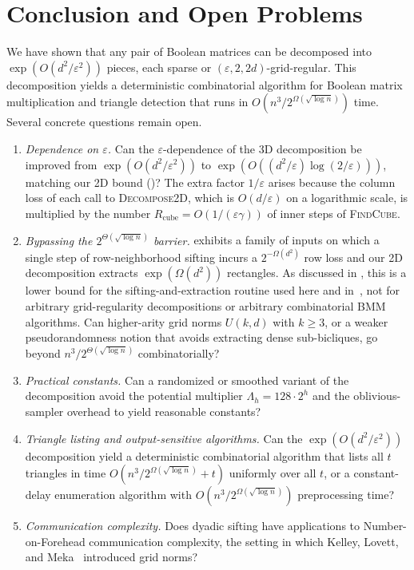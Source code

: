 \documentclass[11pt]{article}
\theoremstyle{definition}
\renewcommand{\label}[1]{}%
\newcommand{\DecomposeTwoD}{\textnormal{\textsc{Decompose2D}}}
\newcommand{\FindCube}{\textnormal{\textsc{FindCube}}}
\begin{document}
\section{Conclusion and Open Problems}
\label{sec:open}

We have shown that any pair of Boolean matrices can be decomposed into $\exp(O(d^2 / \varepsilon^2))$ pieces, each sparse or $(\varepsilon, 2, 2d)$-grid-regular. This decomposition yields a deterministic combinatorial algorithm for Boolean matrix multiplication and triangle detection that runs in $O(n^3 / 2^{\Omega(\sqrt{\log n})})$ time. Several concrete questions remain open.
\begin{enumerate}[leftmargin=*]
    \item \emph{Dependence on $\varepsilon$.} Can the $\varepsilon$-dependence of the 3D decomposition be improved from $\exp(O(d^2 / \varepsilon^2))$ to $\exp(O((d^2 / \varepsilon)\log(2/\varepsilon)))$, matching our 2D bound ()? The extra factor $1/\varepsilon$ arises because the column loss of each call to \DecomposeTwoD{}, which is $O(d/\varepsilon)$ on a logarithmic scale, is multiplied by the number $R_{\text{cube}} = O(1/(\varepsilon\gamma))$ of inner steps of \FindCube{}.
    \item \emph{Bypassing the $2^{\Theta(\sqrt{\log n})}$ barrier.}  exhibits a family of inputs on which a single step of row-neighborhood sifting incurs a $2^{-\Omega(d^2)}$ row loss and our 2D decomposition extracts $\exp(\Omega(d^2))$ rectangles. As discussed in , this is a lower bound for the sifting-and-extraction routine used here and in~\cite{AFKLM24}, not for arbitrary grid-regularity decompositions or arbitrary combinatorial BMM algorithms. Can higher-arity grid norms $U(k, d)$ with $k \ge 3$, or a weaker pseudorandomness notion that avoids extracting dense sub-bicliques, go beyond $n^3 / 2^{\Theta(\sqrt{\log n})}$ combinatorially?
    \item \emph{Practical constants.} Can a randomized or smoothed variant of the decomposition avoid the potential multiplier $\Lambda_h = 128 \cdot 2^h$ and the oblivious-sampler overhead to yield reasonable constants?
    \item \emph{Triangle listing and output-sensitive algorithms.} Can the $\exp(O(d^2 / \varepsilon^2))$ decomposition yield a deterministic combinatorial algorithm that lists all $t$ triangles in time $O(n^3 / 2^{\Omega(\sqrt{\log n})} + t)$ uniformly over all $t$, or a constant-delay enumeration algorithm with $O(n^3 / 2^{\Omega(\sqrt{\log n})})$ preprocessing time?
    \item \emph{Communication complexity.} Does dyadic sifting have applications to Number-on-Forehead communication complexity, the setting in which Kelley, Lovett, and Meka~\cite{KelleyLM23} introduced grid norms?
\end{enumerate}
\end{document}
